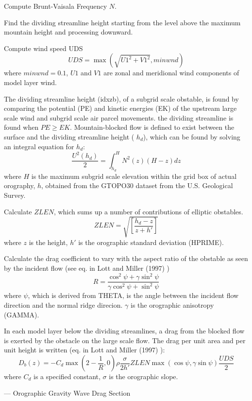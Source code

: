 \begin{DoxyItemize}
\item Compute Brunt-\/\+Vaisala Frequency $N$.
\item Find the dividing streamline height starting from the level above the maximum mountain height and processing downward.
\item Compute wind speed U\+DS \[ UDS=\max(\sqrt{U1^2+V1^2},minwnd) \] where $ minwnd=0.1 $, $U1$ and $V1$ are zonal and meridional wind components of model layer wind.
\item The dividing streamline height (idxzb), of a subgrid scale obstable, is found by comparing the potential (PE) and kinetic energies (EK) of the upstream large scale wind and subgrid scale air parcel movements. the dividing streamline is found when $PE\geq EK$. Mountain-\/blocked flow is defined to exist between the surface and the dividing streamline height ( $h_d$), which can be found by solving an integral equation for $h_d$\+: \[ \frac{U^{2}(h_{d})}{2}=\int_{h_{d}}^{H} N^{2}(z)(H-z)dz \] where $H$ is the maximum subgrid scale elevation within the grid box of actual orography, $h$, obtained from the G\+T\+O\+P\+O30 dataset from the U.\+S. Geological Survey.
\item Calculate $ZLEN$, which sums up a number of contributions of elliptic obstables. \[ ZLEN=\sqrt{[\frac{h_{d}-z}{z+h'}]} \] where $z$ is the height, $h'$ is the orographic standard deviation (H\+P\+R\+I\+ME).
\item Calculate the drag coefficient to vary with the aspect ratio of the obstable as seen by the incident flow (see eq. in Lott and Miller (1997) \cite{lott_and_miller_1997}) \[ R=\frac{\cos^{2}\psi+\gamma\sin^{2}\psi}{\gamma\cos^{2}\psi+\sin^{2}\psi} \] where $\psi$, which is derived from T\+H\+E\+TA, is the angle between the incident flow direction and the normal ridge direcion. $\gamma$ is the orographic anisotropy (G\+A\+M\+MA).
\item In each model layer below the dividing streamlines, a drag from the blocked flow is exerted by the obstacle on the large scale flow. The drag per unit area and per unit height is written (eq. in Lott and Miller (1997) \cite{lott_and_miller_1997})\+: \[ D_{b}(z)=-C_{d}\max(2-\frac{1}{R},0)\rho\frac{\sigma}{2h'}ZLEN\max(\cos\psi,\gamma\sin\psi)\frac{UDS}{2} \] where $C_{d}$ is a specified constant, $\sigma$ is the orographic slope.
\end{DoxyItemize}

--- Orographic Gravity Wave Drag Section


